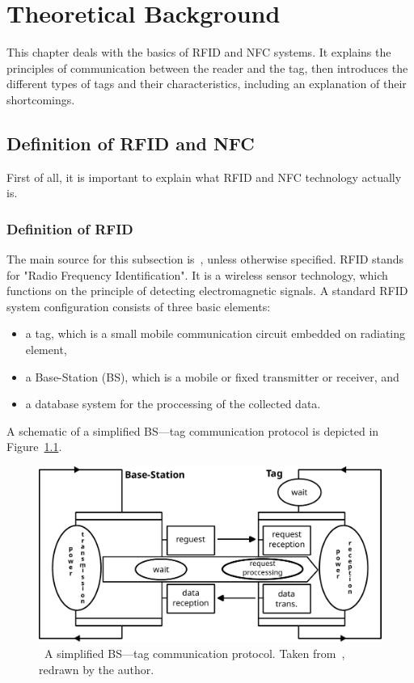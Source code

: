 \chapter{Theoretical Background}
\label{chap:theory}


This chapter deals with the basics of RFID and NFC systems. It explains the principles of communication between the reader and the tag, then introduces the different types of tags and their characteristics, including an explanation of their shortcomings.

\section{Definition of RFID and NFC}

First of all, it is important to explain what RFID and NFC technology actually is. 

\subsection{Definition of RFID}
The main source for this subsection is~\cite{tedjini2005antennas}, unless otherwise specified. RFID stands for "Radio Frequency Identification". It is a wireless sensor technology, which functions on the principle of detecting electromagnetic signals. A standard RFID system configuration consists of three basic elements: 

\begin{itemize}
    \item a tag, which is a small mobile communication circuit embedded on radiating element,
    \item a Base-Station (BS), which is a mobile or fixed transmitter or receiver, and
    \item a database system for the proccessing of the collected data.
\end{itemize}
A schematic of a simplified BS---tag communication protocol is depicted in Figure~\ref{fig:simplified-bs-tag-protocol}.

\begin{figure}[ht]
  \centering
  \includegraphics[width=\textwidth]{text/comm_prot.pdf} %
  \caption[A simplified BS---tag communication protocol.]{~A simplified BS---tag communication protocol. Taken from~\cite{tedjini2005antennas}, redrawn by the author.}
  \label{fig:simplified-bs-tag-protocol}
\end{figure} 


